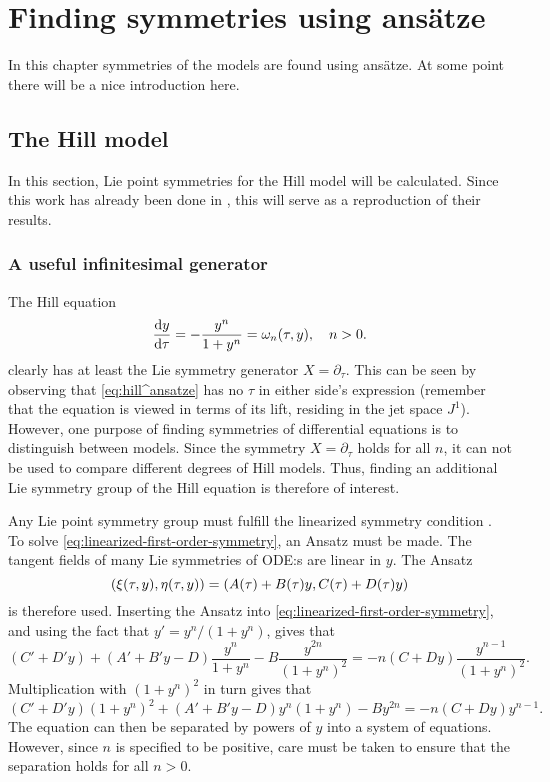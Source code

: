 \chapter{Finding symmetries using ansätze}

In this chapter symmetries of the models are found using ansätze.
At some point there will be a nice introduction here.

\section{The Hill model}

In this section, Lie point symmetries for the Hill model will be calculated.
Since this work has already been done in \cite{ohlsson2020symmetry}, this will serve as a reproduction of their results.

\subsection{A useful infinitesimal generator}

The Hill equation
\begin{equation} \label{eq:hill^ansatze}
  \diff{y}{\tau} = - \frac{y^n}{1 + y^n} = \omega_n(\tau, y), \quad
  n > 0.
\end{equation}
clearly has at least the Lie symmetry generator \(X=\partial_\tau\).
This can be seen by observing that \cref{eq:hill^ansatze} has no \(\tau\) in either side's expression (remember that the equation is viewed in terms of its lift, residing in the jet space \(J^1\)).
However, one purpose of finding symmetries of differential equations is to distinguish between models.
Since the symmetry \(X=\partial_\tau\) holds for all \(n\), it can not be used to compare different degrees of Hill models.
Thus, finding an additional Lie symmetry group of the Hill equation is therefore of interest.

Any Lie point symmetry group must fulfill the linearized symmetry condition .
To solve \cref{eq:linearized-first-order-symmetry}, an Ansatz must be made.
The tangent fields of many Lie symmetries of ODE:s are linear in \(y\).
The Ansatz
\begin{equation}
  \pqty{\xi(\tau,y),\eta(\tau,y)} = \pqty{A(\tau) + B(\tau)y,C(\tau) + D(\tau)y}
\end{equation}
is therefore used.
Inserting the Ansatz into \cref{eq:linearized-first-order-symmetry}, and using the fact that \(y' = y^n / (1 + y^n)\), gives that
\begin{equation}
  (C' + D'y) + (A' + B'y - D) \frac{y^n}{1 + y^n} - B \frac{y^{2n}}{(1 + y^n)^2} =
  -n(C + Dy) \frac{y^{n-1}}{(1 + y^n)^2}.
\end{equation}
Multiplication with \((1 + y^n)^2\) in turn gives that
\begin{equation} \label{eq:hill-linear-symmetry}
  (C' + D'y)(1 + y^n)^2 + (A' + B'y - D)y^n(1 + y^n) - By^{2n} =
  -n(C + Dy) y^{n-1}.
\end{equation}
The equation can then be separated by powers of \(y\) into a system of equations.
However, since \(n\) is specified to be positive, care must be taken to ensure that the separation holds for all \(n>0\).

